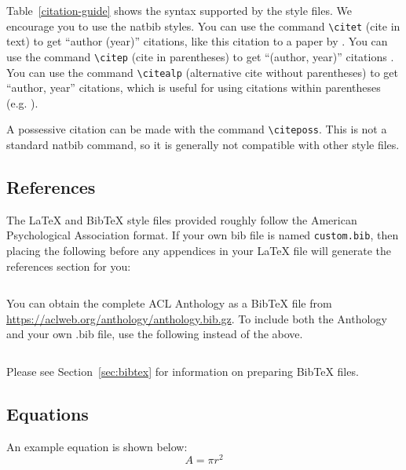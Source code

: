 \documentclass[11pt]{article}
\begin{document}
Table~\ref{citation-guide} shows the syntax supported by the style files.
We encourage you to use the natbib styles.
You can use the command \verb|\citet| (cite in text) to get ``author (year)'' citations, like this citation to a paper by \citet{Gusfield:97}.
You can use the command \verb|\citep| (cite in parentheses) to get ``(author, year)'' citations \citep{Gusfield:97}.
You can use the command \verb|\citealp| (alternative cite without parentheses) to get ``author, year'' citations, which is useful for using citations within parentheses (e.g. \citealp{Gusfield:97}).

A possessive citation can be made with the command \verb|\citeposs|.
This is not a standard natbib command, so it is generally not compatible
with other style files.

\subsection{References}

\nocite{Ando2005,andrew2007scalable,rasooli-tetrault-2015}

The \LaTeX{} and Bib\TeX{} style files provided roughly follow the American Psychological Association format.
If your own bib file is named \texttt{custom.bib}, then placing the following before any appendices in your \LaTeX{} file will generate the references section for you:
\begin{quote}
  \begin{verbatim}

\end{verbatim}
\end{quote}

You can obtain the complete ACL Anthology as a Bib\TeX{} file from \url{https://aclweb.org/anthology/anthology.bib.gz}.
To include both the Anthology and your own .bib file, use the following instead of the above.
\begin{quote}
  \begin{verbatim}

\end{verbatim}
\end{quote}

Please see Section~\ref{sec:bibtex} for information on preparing Bib\TeX{} files.

\subsection{Equations}

An example equation is shown below:
\begin{equation}
  \label{eq:example}
  A = \pi r^2
\end{equation}
\end{document}
